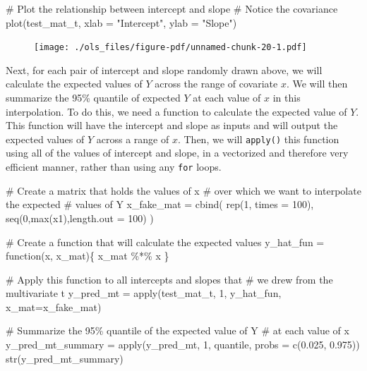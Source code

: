 \documentclass[
  letterpaper,
  DIV=11,
  numbers=noendperiod]{scrreprt}
\newenvironment{Shaded}{\begin{snugshade}}{\end{snugshade}}
\newcommand{\AttributeTok}[1]{\textcolor[rgb]{0.40,0.45,0.13}{#1}}
\newcommand{\CommentTok}[1]{\textcolor[rgb]{0.37,0.37,0.37}{#1}}
\newcommand{\ControlFlowTok}[1]{\textcolor[rgb]{0.00,0.23,0.31}{#1}}
\newcommand{\DecValTok}[1]{\textcolor[rgb]{0.68,0.00,0.00}{#1}}
\newcommand{\FloatTok}[1]{\textcolor[rgb]{0.68,0.00,0.00}{#1}}
\newcommand{\FunctionTok}[1]{\textcolor[rgb]{0.28,0.35,0.67}{#1}}
\newcommand{\NormalTok}[1]{\textcolor[rgb]{0.00,0.23,0.31}{#1}}
\newcommand{\OtherTok}[1]{\textcolor[rgb]{0.00,0.23,0.31}{#1}}
\newcommand{\SpecialCharTok}[1]{\textcolor[rgb]{0.37,0.37,0.37}{#1}}
\newcommand{\StringTok}[1]{\textcolor[rgb]{0.13,0.47,0.30}{#1}}
\begin{document}
\begin{Shaded}
\begin{Highlighting}[]
\CommentTok{\# Plot the relationship between intercept and slope}
\CommentTok{\# Notice the covariance}
\FunctionTok{plot}\NormalTok{(test\_mat\_t, }\AttributeTok{xlab =} \StringTok{"Intercept"}\NormalTok{, }\AttributeTok{ylab =} \StringTok{"Slope"}\NormalTok{)}
\end{Highlighting}
\end{Shaded}

\begin{figure}[H]

{\centering \texttt{[image: ./ols\_files/figure-pdf/unnamed-chunk-20-1.pdf]}

}

\end{figure}

Next, for each pair of intercept and slope randomly drawn above, we will
calculate the expected values of \(Y\) across the range of covariate
\(x\). We will then summarize the 95\% quantile of expected \(Y\) at
each value of \(x\) in this interpolation. To do this, we need a
function to calculate the expected value of \(Y\). This function will
have the intercept and slope as inputs and will output the expected
values of \(Y\) across a range of \(x\). Then, we will \texttt{apply()}
this function using all of the values of intercept and slope, in a
vectorized and therefore very efficient manner, rather than using any
\texttt{for} loops.

\begin{Shaded}
\begin{Highlighting}[]
\CommentTok{\# Create a matrix that holds the values of x}
\CommentTok{\# over which we want to interpolate the expected}
\CommentTok{\# values of Y}
\NormalTok{x\_fake\_mat }\OtherTok{=} 
  \FunctionTok{cbind}\NormalTok{(}
    \FunctionTok{rep}\NormalTok{(}\DecValTok{1}\NormalTok{, }\AttributeTok{times =} \DecValTok{100}\NormalTok{),}
    \FunctionTok{seq}\NormalTok{(}\DecValTok{0}\NormalTok{,}\FunctionTok{max}\NormalTok{(x1),}\AttributeTok{length.out =} \DecValTok{100}\NormalTok{)}
\NormalTok{  )}

\CommentTok{\# Create a function that will calculate the expected values}
\NormalTok{y\_hat\_fun }\OtherTok{=} \ControlFlowTok{function}\NormalTok{(x, x\_mat)\{}
\NormalTok{  x\_mat }\SpecialCharTok{\%*\%}\NormalTok{ x}
\NormalTok{\}}

\CommentTok{\# Apply this function to all intercepts and slopes that}
\CommentTok{\# we drew from the multivariate t}
\NormalTok{y\_pred\_mt }\OtherTok{=} \FunctionTok{apply}\NormalTok{(test\_mat\_t, }\DecValTok{1}\NormalTok{, y\_hat\_fun, }\AttributeTok{x\_mat=}\NormalTok{x\_fake\_mat)}

\CommentTok{\# Summarize the 95\% quantile of the expected value of Y}
\CommentTok{\# at each value of x }
\NormalTok{y\_pred\_mt\_summary }\OtherTok{=} \FunctionTok{apply}\NormalTok{(y\_pred\_mt, }\DecValTok{1}\NormalTok{, quantile, }\AttributeTok{probs =} \FunctionTok{c}\NormalTok{(}\FloatTok{0.025}\NormalTok{, }\FloatTok{0.975}\NormalTok{))}
\FunctionTok{str}\NormalTok{(y\_pred\_mt\_summary)}
\end{Highlighting}
\end{Shaded}
\end{document}
